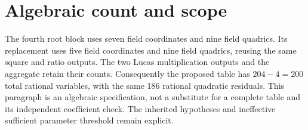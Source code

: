 \documentclass[11pt]{article}
\begin{document}
\section*{Algebraic count and scope}
The fourth root block uses seven field coordinates and nine field
quadrics. Its replacement uses five field coordinates and nine field
quadrics, reusing the same square and ratio outputs. The two Lucas
multiplication outputs and the aggregate retain their counts.
Consequently the proposed table has $204-4=200$ total rational variables,
with the same 186 rational quadratic residuals. This paragraph is an
algebraic specification, not a substitute for a complete table and its
independent coefficient check. The inherited hypotheses and ineffective
sufficient parameter threshold remain explicit.
\end{document}
